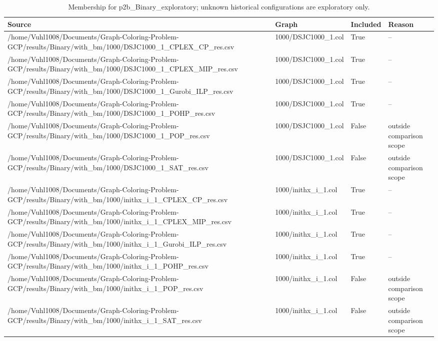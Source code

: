 \begin{table}[htbp]
\centering
\caption{Membership for p2b\_Binary\_exploratory; unknown historical configurations are exploratory only.}
\label{tab:p2b-Binary-exploratory-membership}
\begin{tabular}{llll}
\hline
Source & Graph & Included & Reason \\
\hline
/home/Vuhl1008/Documents/Graph-Coloring-Problem-GCP/results/Binary/with\_bm/1000/DSJC1000\_1\_CPLEX\_CP\_res.csv & 1000/DSJC1000\_1.col & True & -- \\
/home/Vuhl1008/Documents/Graph-Coloring-Problem-GCP/results/Binary/with\_bm/1000/DSJC1000\_1\_CPLEX\_MIP\_res.csv & 1000/DSJC1000\_1.col & True & -- \\
/home/Vuhl1008/Documents/Graph-Coloring-Problem-GCP/results/Binary/with\_bm/1000/DSJC1000\_1\_Gurobi\_ILP\_res.csv & 1000/DSJC1000\_1.col & True & -- \\
/home/Vuhl1008/Documents/Graph-Coloring-Problem-GCP/results/Binary/with\_bm/1000/DSJC1000\_1\_POHP\_res.csv & 1000/DSJC1000\_1.col & True & -- \\
/home/Vuhl1008/Documents/Graph-Coloring-Problem-GCP/results/Binary/with\_bm/1000/DSJC1000\_1\_POP\_res.csv & 1000/DSJC1000\_1.col & False & outside comparison scope \\
/home/Vuhl1008/Documents/Graph-Coloring-Problem-GCP/results/Binary/with\_bm/1000/DSJC1000\_1\_SAT\_res.csv & 1000/DSJC1000\_1.col & False & outside comparison scope \\
/home/Vuhl1008/Documents/Graph-Coloring-Problem-GCP/results/Binary/with\_bm/1000/inithx\_i\_1\_CPLEX\_CP\_res.csv & 1000/inithx\_i\_1.col & True & -- \\
/home/Vuhl1008/Documents/Graph-Coloring-Problem-GCP/results/Binary/with\_bm/1000/inithx\_i\_1\_CPLEX\_MIP\_res.csv & 1000/inithx\_i\_1.col & True & -- \\
/home/Vuhl1008/Documents/Graph-Coloring-Problem-GCP/results/Binary/with\_bm/1000/inithx\_i\_1\_Gurobi\_ILP\_res.csv & 1000/inithx\_i\_1.col & True & -- \\
/home/Vuhl1008/Documents/Graph-Coloring-Problem-GCP/results/Binary/with\_bm/1000/inithx\_i\_1\_POHP\_res.csv & 1000/inithx\_i\_1.col & True & -- \\
/home/Vuhl1008/Documents/Graph-Coloring-Problem-GCP/results/Binary/with\_bm/1000/inithx\_i\_1\_POP\_res.csv & 1000/inithx\_i\_1.col & False & outside comparison scope \\
/home/Vuhl1008/Documents/Graph-Coloring-Problem-GCP/results/Binary/with\_bm/1000/inithx\_i\_1\_SAT\_res.csv & 1000/inithx\_i\_1.col & False & outside comparison scope \\

\end{tabular}
\end{table}
